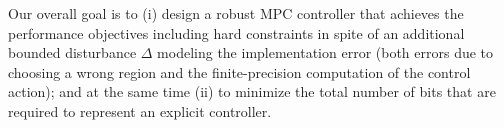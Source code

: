 Our overall goal is to 
(i) design a robust MPC controller that achieves the performance objectives including hard constraints in spite of an additional bounded
disturbance $\Delta$ modeling the implementation error (both errors due to choosing a wrong region and the finite-precision computation of the control action);
and at the same time
(ii) to minimize the total number of bits that are required to represent an explicit controller.

	
	
	
